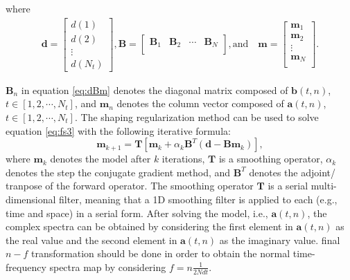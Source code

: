 where 
\begin{align}
\label{eq:dBm}
\mathbf{d} = \left[\begin{array}{c}
d(1) \\
d(2) \\
\vdots \\
d(N_t)
\end{array}
\right], \mathbf{B}=\left[\begin{array}{cccc}
\mathbf{B}_1 & \mathbf{B}_2 & \cdots & \mathbf{B}_N \\
\end{array}
\right], \text{and}\quad \mathbf{m}=\left[\begin{array}{c}
\mathbf{m}_1\\
\mathbf{m}_2\\
\vdots\\
\mathbf{m}_N\\
\end{array}\right].
\end{align}

$\mathbf{B}_n$ in equation \ref{eq:dBm} denotes the diagonal matrix composed of $\mathbf{b}(t,n)$, $t\in[1,2,\cdots,N_t]$, and $\mathbf{m}_n$ denotes the column vector composed of $\mathbf{a}(t,n)$, $t\in[1,2,\cdots,N_t]$. 
The shaping regularization method \cite[]{fomel2007shape} can be used to solve equation \ref{eq:fs3} with the following iterative formula:
\begin{equation}
\label{eq:shape}
\mathbf{m}_{k+1} = \mathbf{T}\left[\mathbf{m}_k + \alpha_k \mathbf{B}^T(\mathbf{d}-\mathbf{Bm}_k)\right],
\end{equation}
where $\mathbf{m}_{k}$ denotes the model after $k$ iterations, $\mathbf{T}$ is a smoothing operator, $\alpha_k$ denotes the step  the conjugate gradient method, and $\mathbf{B}^T$ denotes the adjoint/ tranpose of the forward operator. The smoothing operator $\mathbf{T}$ is a serial multi-dimensional filter, meaning that a 1D smoothing filter  is applied to each  (e.g., time and space) in a serial form. After solving the model, i.e., $\mathbf{a}(t,n)$, the complex spectra can be obtained by considering the first element in $\mathbf{a}(t,n)$ as the real value and the second element in $\mathbf{a}(t,n)$ as the imaginary value.  final $n-f$ transformation should be done in order to obtain the normal time-frequency spectra map by considering $f=n\frac{1}{2Ndt}$.

